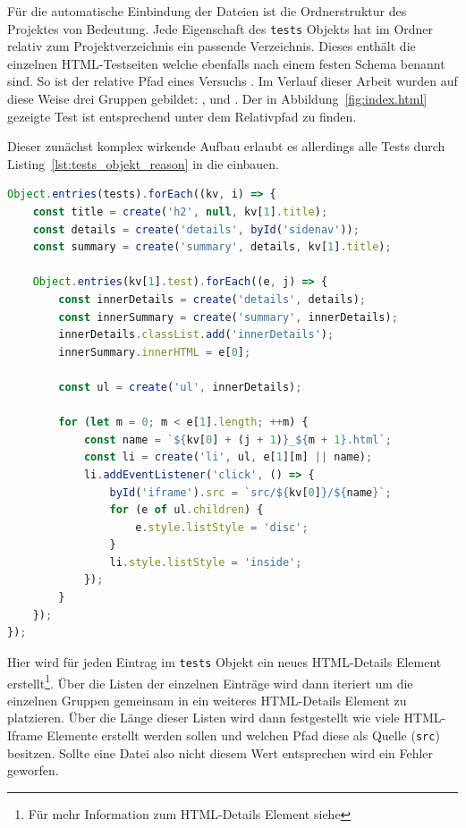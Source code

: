 Für die automatische Einbindung der Dateien ist die Ordnerstruktur des Projektes von Bedeutung.
Jede Eigenschaft des \lstinline{tests} Objekts hat im  Ordner relativ zum Projektverzeichnis ein passende Verzeichnis.
Dieses enthält die einzelnen HTML-Testseiten welche ebenfalls nach einem festen Schema benannt sind.
So ist der relative Pfad eines Versuchs .
Im Verlauf dieser Arbeit wurden auf diese Weise drei Gruppen gebildet: ,  und .
Der in Abbildung~\ref{fig:index.html} gezeigte Test ist entsprechend unter dem Relativpfad  zu finden.

Dieser zunächst komplex wirkende Aufbau erlaubt es allerdings alle Tests durch Listing~\ref{lst:tests_objekt_reason} in die  einbauen.

\begin{lstlisting}[language=JavaScript, caption={Iteration über das tests Objekt zur Population der index.html.}, label={lst:tests_objekt_reason}]
Object.entries(tests).forEach((kv, i) => {
    const title = create('h2', null, kv[1].title);
    const details = create('details', byId('sidenav'));
    const summary = create('summary', details, kv[1].title);

    Object.entries(kv[1].test).forEach((e, j) => {
        const innerDetails = create('details', details);
        const innerSummary = create('summary', innerDetails);
        innerDetails.classList.add('innerDetails');
        innerSummary.innerHTML = e[0];

        const ul = create('ul', innerDetails);

        for (let m = 0; m < e[1].length; ++m) {
            const name = `${kv[0] + (j + 1)}_${m + 1}.html`;
            const li = create('li', ul, e[1][m] || name);
            li.addEventListener('click', () => {
                byId('iframe').src = `src/${kv[0]}/${name}`;
                for (e of ul.children) {
                    e.style.listStyle = 'disc';
                }
                li.style.listStyle = 'inside';
            });
        }
    });
});
\end{lstlisting}

Hier wird für jeden Eintrag im \lstinline{tests} Objekt ein neues HTML-Details Element erstellt\footnote{Für mehr Information zum HTML-Details Element siehe }.
Über die Listen der einzelnen Einträge wird dann iteriert um die einzelnen Gruppen gemeinsam in ein weiteres HTML-Details Element zu platzieren.
Über die Länge dieser Listen wird dann festgestellt wie viele HTML-Iframe Elemente erstellt werden sollen und welchen Pfad diese als Quelle (\lstinline{src}) besitzen.
Sollte eine Datei also nicht diesem Wert entsprechen wird ein Fehler geworfen.

